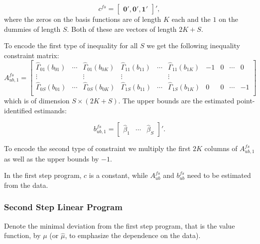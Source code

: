 \documentclass[12pt,a4paper,english]{article} %
\numberwithin{equation}{section}
\numberwithin{figure}{section}
\numberwithin{table}{section}
\begin{document}
\begin{equation*}
  c^{fs} =
  \begin{bmatrix}
     \mathbf{0}', \mathbf{0}', \mathbf{1}'
  \end{bmatrix}',
\end{equation*}
where the zeros on the basis functions are of length $K$ each and the $1$ on the dummies of length $S$.
Both of these are vectors of length $2K + S$.


To encode the first type of inequality for all $S$ we get the following inequality constraint matrix:
\begin{equation*}
  A_{ub, 1}^{fs} =
  \begin{bmatrix}
    \hat{\Gamma}_{01}(b_{01}) & \cdots & \hat{\Gamma}_{01}(b_{0K}) & \hat{\Gamma}_{11}(b_{11}) & \cdots & \hat{\Gamma}_{11}(b_{1K}) & -1 & 0 & \cdots & 0 \\
    \vdots & & \vdots & \vdots &  & \vdots & \\
    \hat{\Gamma}_{0S}(b_{01}) & \cdots & \hat{\Gamma}_{0S}(b_{0K}) & \hat{\Gamma}_{1S}(b_{11}) & \cdots & \hat{\Gamma}_{1S}(b_{1K}) & 0 & 0 & \cdots & -1 \\
  \end{bmatrix}
\end{equation*}
which is of dimension $S\times (2K + S)$. The upper bounds are the estimated point-identified estimands:

\begin{equation*}
  b_{ub, 1}^{fs} =
  \begin{bmatrix}
    \hat{\beta}_1 & \cdots & \hat{\beta}_S
  \end{bmatrix}'.
\end{equation*}

To encode the second type of constraint we multiply the first $2K$ columns of $A_{ub, 1}^{fs}$ as well as the upper bounds by $-1$.

In the first step program, $c$ is a constant, while $A_{ub}^{fs}$ and $b_{ub}^{fs}$ need to be estimated from the data.

\subsubsection{Second Step Linear Program}
Denote the minimal deviation from the first step program, that is the value function, by $\mu$ (or $\hat{\mu}$, to emphasize the dependence on the data).
\end{document}

